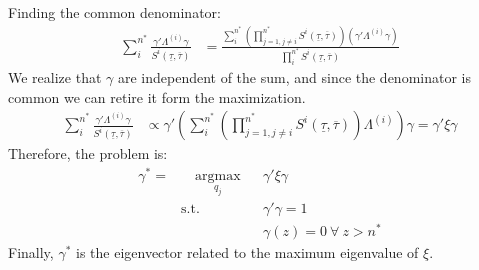 \documentclass[12pt, a4paper]{article}
\begin{document}
Finding the common denominator:
\begin{equation*}
\begin{aligned}
\sum_i^{n^*}\frac{\gamma' \Lambda^{(i)} \gamma}{S^{i}(\underline{\tau},\overline{\tau})} 
&= 
\frac{\sum_i^{n^*} \left( \prod_{j=1,j\neq i}^{n^*} S^{i}(\underline{\tau},\overline{\tau})\right) \left( \gamma' \Lambda^{(i)} \gamma \right)}{\prod_i^{n^*} S^{i}(\underline{\tau},\overline{\tau})}
\end{aligned}
\end{equation*}
We realize that $\gamma$ are independent of the sum, and since the denominator is common we can retire it form the maximization.
\begin{equation*}
\begin{aligned}
\sum_i^{n^*}\frac{\gamma' \Lambda^{(i)} \gamma}{S^{i}(\underline{\tau},\overline{\tau})} 
& \propto 
\gamma' \left( \sum_i^{n^*} \left( \prod_{j=1,j\neq i}^{n^*}  S^{i}(\underline{\tau},\overline{\tau})\right) \Lambda^{(i)} \right) \gamma = \gamma' \xi  \gamma
\end{aligned}
\end{equation*}
Therefore, the problem is:
\begin{equation*}
\begin{aligned}
\gamma^* =  & \quad \underset{q_j}{\text{argmax}}
& & \gamma' \xi \gamma \\
& \text{s.t.}
& & \gamma' \gamma = 1\\
& & & \gamma(z) = 0 \ \forall \ z > n^*
\end{aligned}
\end{equation*}
Finally, $\gamma^*$ is the eigenvector related to the maximum eigenvalue of $\xi$.
\end{document}

